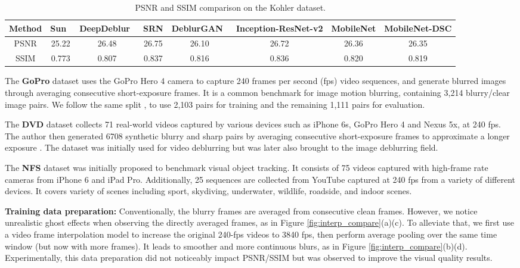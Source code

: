 \documentclass[10pt,twocolumn,letterpaper]{article}
\begin{document}
\begin{table*}[htb]
\small
\caption{PSNR and SSIM comparison on the Kohler dataset. }
\vspace{-0.5em}
\label{T:kohler}
\centering
\begin{tabular}{ccccc|ccc}
\toprule
Method & Sun~\cite{SunLearningRemoval} & DeepDeblur~\cite{Nah2016DeepDeblurring} & SRN \cite{tao2018scale} & DeblurGAN~\cite{kupyn2018deblurgan} & Inception-ResNet-v2 & MobileNet  & MobileNet-DSC\\ 
\hline
PSNR & 25.22 & 26.48 & 26.75  & 26.10 & 26.72 & 26.36 & 26.35 \\
SSIM & 0.773  & 0.807 & 0.837  & 0.816 & 0.836 & 0.820 & 0.819  \\
\bottomrule
\end{tabular}
\vspace{-1em}
\end{table*}


The \textbf{GoPro} dataset \cite{Nah2016DeepDeblurring} uses the GoPro Hero 4 camera to capture 240 frames per second (fps) video sequences, and generate blurred images through averaging consecutive short-exposure frames. It is a common benchmark for image motion blurring, containing 3,214 blurry/clear image pairs. We follow the same split \cite{Nah2016DeepDeblurring}, to use 2,103 pairs for training and the remaining 1,111 pairs for evaluation.



The \textbf{DVD} dataset \cite{su2017deep} collects 71 real-world videos captured by various devices such as iPhone 6s, GoPro Hero 4 and Nexus 5x, at 240 fps. The author then generated 6708 synthetic blurry and sharp pairs by averaging consecutive short-exposure frames to approximate a longer exposure \cite{telleen2007synthetic}. The dataset was initially used for video deblurring but was later also brought to the image deblurring field.




The \textbf{NFS} dataset \cite{kiani2017need} was initially proposed to benchmark visual object tracking. It consists of 75 videos captured with high-frame rate cameras from iPhone 6 and iPad Pro. Additionally, 25 sequences are collected from YouTube captured at 240
fps from a variety of different devices. It covers variety of scenes including sport, skydiving, underwater, wildlife, roadside, and indoor scenes.

\textbf{Training data preparation:} Conventionally, the blurry frames are averaged from consecutive clean frames. However, we notice unrealistic ghost effects when observing the directly averaged frames, as in Figure \ref{fig:interp_compare}(a)(c). To alleviate that, we first use a video frame interpolation model \cite{niklaus2017video} to increase the original 240-fps videos to 3840 fps, then perform average pooling over the same time window (but now with more frames). It leads to smoother and more continuous blurs, as in Figure \ref{fig:interp_compare}(b)(d). Experimentally, this data preparation did not noticeably impact PSNR/SSIM but was observed to improve the visual quality results.
\end{document}
